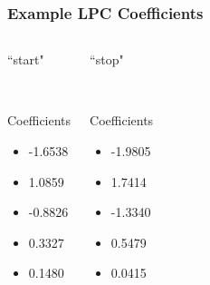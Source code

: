 \documentclass{beamer}
\begin{document}
\begin{frame}
\frametitle{Example LPC Coefficients}
\begin{columns}[c]
  \column{1.8in}
    \begin{block}{``start"}
    \begin{center}
    \\
    \end{center}
    Coefficients
  	\begin{itemize}
	\item -1.6538
	\item 1.0859
	\item -0.8826
	\item 0.3327
	\item 0.1480
  	\end{itemize}
	\end{block}
  \column{1.8in}
  	\begin{block}{``stop"}
  	\begin{center}
  	\\
  	\end{center}
  	Coefficients
  	\begin{itemize}
  	\item -1.9805
	\item 1.7414
	\item -1.3340
	\item 0.5479
	\item 0.0415
  	\end{itemize}
	\end{block}
\end{columns}
\end{frame}

\end{document}
